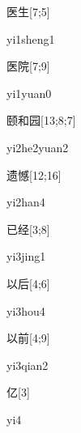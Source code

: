 \begin{verbete}[yi1sheng1]{医生}[7;5]
\begin{pronuncia}{yi1sheng1}
\end{pronuncia}
\end{verbete}

\begin{verbete}[yi1yuan0]{医院}[7;9]
\begin{pronuncia}{yi1yuan0}
\end{pronuncia}
\end{verbete}

\begin{verbete}[yi2he2yuan2]{颐和园}[13;8;7]
\begin{pronuncia}{yi2he2yuan2}
\end{pronuncia}
\end{verbete}

\begin{verbete}[yi2han4]{遗憾}[12;16]
\begin{pronuncia}{yi2han4}
\end{pronuncia}
\end{verbete}

\begin{verbete}[yi3jing1]{已经}[3;8]
\begin{pronuncia}{yi3jing1}
\end{pronuncia}
\end{verbete}

\begin{verbete}[yi3hou4]{以后}[4;6]
\begin{pronuncia}{yi3hou4}
\end{pronuncia}
\end{verbete}

\begin{verbete}[yi3qian2]{以前}[4;9]
\begin{pronuncia}{yi3qian2}
\end{pronuncia}
\end{verbete}

\begin{verbete}[yi4]{亿}[3]
\begin{pronuncia}{yi4}
\end{pronuncia}
\end{verbete}

